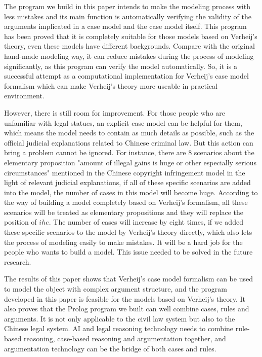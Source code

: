 \documentclass{IOS-Book-Article}
\begin{document}
The program we build in this paper intends to make the modeling process with less mistakes and its main function is automatically verifying the validity of the arguments implicated in a case model and the case model itself. This program has been proved that it is completely suitable for those models based on Verheij's theory, even these models have different backgrounds. Compare with the original hand-made modeling way, it can reduce mistakes during the process of modeling significantly, as this program can verify the model automatically. So, it is a successful attempt as a computational implementation for Verheij's case model formalism which can make Verheij's theory more useable in practical environment. 

However, there is still room for improvement. For those people who are unfamiliar with legal statues, an explicit case model can be helpful for them, which means the model needs to contain as much details as possible, such as the official judicial explanations related to Chinese criminal law. But this action can bring a problem cannot be ignored. For instance, there are 8 scenarios about the elementary proposition "amount of illegal gains is huge or other especially serious circumstances" mentioned in the Chinese copyright infringement model in the light of relevant judicial explanations, if all of these specific scenarios are added into the model, the number of cases in this model will become huge. According to the way of building a model completely based on Verheij's formalism, all these scenarios will be treated as elementary propositions and they will replace the position of  $ihe$. The number of cases will increase by eight times, if we added these specific scenarios to the model by Verheij's theory directly, which also lets the process of modeling easily to make mistakes. It will be a hard job for the people who wants to build a model. This issue needed to be solved in the future research.

The results of this paper shows that Verheij's case model formalism can be used to model the object with complex argument structure, and the program developed in this paper is feasible for the models based on Verheij's theory. It also proves that the Prolog program we built can well combine cases, rules and arguments. It is not only applicable to the civil law system but also to the Chinese legal system. AI and legal reasoning technology needs to combine rule-based reasoning, case-based reasoning and argumentation together, and argumentation technology can be the bridge of both cases and rules.

\footnotesize


\end{document}
